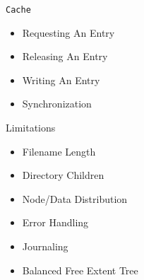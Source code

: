 \documentclass[landscape]{slides}
\newcommand{\code}[1]{\texttt{#1}}
\begin{document}
    \begin{slide}
	\begin{center}\large \code{Cache}\end{center}
	\begin{itemize}
	    \item Requesting An Entry
	    \item Releasing An Entry
	    \item Writing An Entry
	    \item Synchronization
	\end{itemize}
    \end{slide}

    \begin{slide}
	\begin{center}\large Limitations\end{center}
	\begin{itemize}
	    \item Filename Length
	    \item Directory Children
	    \item Node/Data Distribution
	    \item Error Handling
	    \item Journaling
	    \item Balanced Free Extent Tree
	\end{itemize}
    \end{slide}
\end{document}
